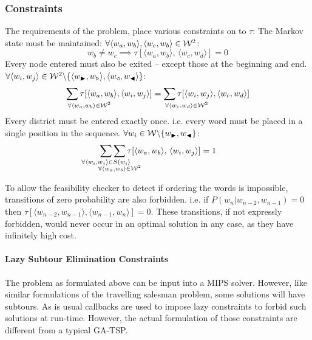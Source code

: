 \documentclass[twocolumn]{article}
\begin{document}
\subsubsection{Constraints}
The requirements of the problem, place various constraints on to $\tau$:
%
The Markov state must be maintained: $\forall\langle w_{a},w_{b}\rangle,\langle w_{c},w_{b}\rangle\in\mathcal{W}^{2}$:
\begin{equation*}
w_{b}\ne w_{c} \implies \tau[\langle w_{a},w_{b}\rangle,\,\langle w_{c},w_{d}\rangle]=0
\end{equation*}
%
Every node entered must also be exited -- except those at the beginning and end. \\$\forall\langle w_{i},w_{j}\rangle\in\mathcal{W}^{2}\backslash\{\langle w_{\blacktriangleright},w_{\triangleright}\rangle,\langle w_{\triangleleft},w_{\blacktriangleleft}\rangle\}$: 
\begin{gather*}%
 \sum_{\mathrlap{\!\!\!\!\forall\langle w_{a},w_{b}\rangle\in\W^{2}}}\tau[\langle w_{a},w_{b}\rangle,\langle w_{i},w_{j}\rangle]
=\sum_{\mathrlap{\!\!\!\!\forall\langle w_{c},w_{d}\rangle\in\W^{2}}}\tau[\langle w_{i},w_{j}\rangle,\langle w_{c},w_{d}\rangle]
\end{gather*}
%
Every district must be entered exactly once. i.e. every word must be placed in a single position in the sequence. $\forall w_{i}\in\mathcal{W}\backslash\{w_{\blacktriangleright},w_{\blacktriangleleft}\}$:
\displayunskip
\begin{gather*}
\sum_{\mathclap{\forall\langle w_{i},w_{j}\rangle\in S(w_{i}\rangle}}
\sum_{\mathclap{\substack{\; \\ \;\\ \forall\langle w_{a},w_{b}\rangle\in\W^{2}}}}
\tau[\langle w_{a},w_{b}\rangle,\,\langle w_{i},w_{j}\rangle]=1
\end{gather*}

To allow the feasibility checker to detect if ordering the words is
impossible, transitions of zero probability are also forbidden. i.e. if \mbox{$P(w_{n}|w_{n-2},w_{n-1})=0$} then \mbox{$\tau[\langle w_{n-2},w_{n-1}\rangle,\langle w_{n-1},w_{n}\rangle]=0$}.
These transitions, if not expressly forbidden, would never occur in
an optimal solution in any case, as they have infinitely high cost.


\paragraph{Lazy Subtour Elimination Constraints}

The problem as formulated above can be input into a MIPS solver. However, like similar formulations of the travelling salesman problem, some solutions will have subtours.
As is usual callbacks are used to impose lazy constraints to forbid such solutions at run-time.  
However, the actual formulation of those constraints are different from a typical GA-TSP.
\end{document}

